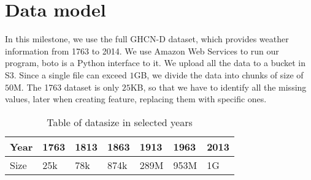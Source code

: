 \section{Data model}
    In this milestone, we use the full GHCN-D\cite{GHCN-D} dataset, which provides weather information from 1763 to 2014. 
    We use Amazon Web Services to run our program, boto\cite{boto} is a Python interface to it. We upload all the data to a bucket in S3\cite{S3}. Since a single file can exceed $1$GB, we divide the data into chunks of size of $50$M.
    The 1763 dataset is only $25$KB, so that we have to identify all the missing values, later when creating feature, replacing them with specific ones.
\begin{table}[htbp]
    \centering
    \caption{Table of datasize in selected years}
    \begin{tabular}{|l|l|l|l|l|l|l|}
        \hline
        Year & 1763 & 1813 & 1863 & 1913 & 1963 & 2013 \\ 
        \hline
        Size & 25k &  78k & 874k & 289M & 953M & 1G \\ 
        \hline 
    \end{tabular}
\end{table}
